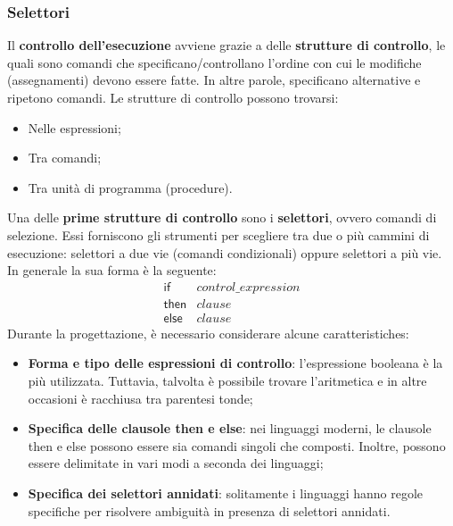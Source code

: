 \documentclass[a4paper]{article}
\begin{document}
 	\subsubsection{Selettori}
 	
 	Il \textbf{controllo dell'esecuzione} avviene grazie a delle \textbf{strutture di controllo}, le quali sono comandi che specificano/controllano l'ordine con cui le modifiche (assegnamenti) devono essere fatte. In altre parole, specificano alternative e ripetono comandi. Le strutture di controllo possono trovarsi:
 	\begin{itemize}
 		\item Nelle espressioni;
 		\item Tra comandi;
 		\item Tra unità di programma (procedure).
 	\end{itemize}
 	Una delle \textbf{prime strutture di controllo} sono i \textcolor{Red3}{\textbf{selettori}}, ovvero comandi di selezione. Essi forniscono gli strumenti per scegliere tra due o più cammini di esecuzione: selettori a due vie (comandi condizionali) oppure selettori a più vie. In generale la sua forma è la seguente:
 	\begin{equation*}
 		\begin{array}{ll}
 			\mathsf{if} 	& control\_expression \\
 			\mathsf{then}	& clause \\
 			\mathsf{else}	& clause
 		\end{array}
 	\end{equation*}
 	Durante la progettazione, è necessario considerare alcune caratteristiches:
 	\begin{itemize}
 		\item \textbf{Forma e tipo delle espressioni di controllo}: l'espressione booleana è la più utilizzata. Tuttavia, talvolta è possibile trovare l'aritmetica e in altre occasioni è racchiusa tra parentesi tonde;
 		
 		\item \textbf{Specifica delle clausole \textsf{then} e \textsf{else}}: nei linguaggi moderni, le clausole \textsf{then} e \textsf{else} possono essere sia comandi singoli che composti. Inoltre, possono essere delimitate in vari modi a seconda dei linguaggi;
 		
 		\item \textbf{Specifica dei selettori annidati}: solitamente i linguaggi hanno regole specifiche per risolvere ambiguità in presenza di selettori annidati.
 	\end{itemize}\newpage
 	
\end{document}
